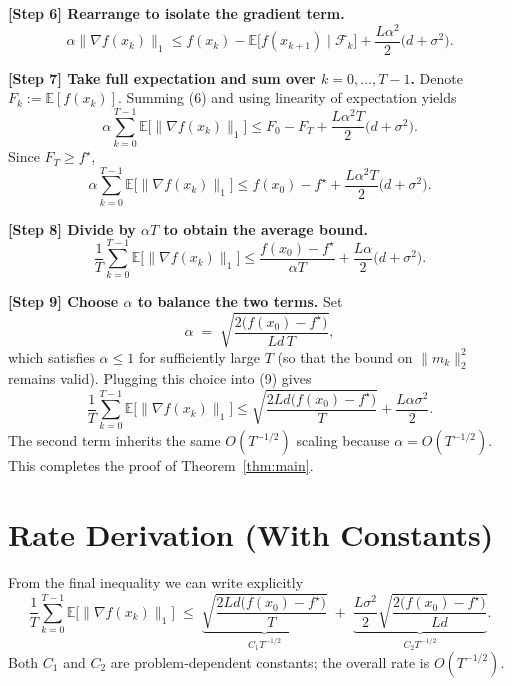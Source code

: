 \documentclass{article}
\newcommand{\E}{\mathbb{E}}
\begin{document}
\noindent\textbf{[Step 6] Rearrange to isolate the gradient term.}
\[
\alpha\|\nabla f(x_{k})\|_{1}
\le f(x_{k})-\E\!\bigl[f(x_{k+1})\mid\mathcal{F}_{k}\bigr]
+\frac{L\alpha^{2}}{2}\bigl(d+\sigma^{2}\bigr). \tag{6}
\]

\noindent\textbf{[Step 7] Take full expectation and sum over $k=0,\dots ,T-1$.}
Denote $F_{k}:=\E[f(x_{k})]$. Summing (6) and using linearity of expectation yields
\[
\alpha\sum_{k=0}^{T-1}\E\!\bigl[\|\nabla f(x_{k})\|_{1}\bigr]
\le F_{0}-F_{T}
+ \frac{L\alpha^{2}T}{2}\bigl(d+\sigma^{2}\bigr). \tag{7}
\]
Since $F_{T}\ge f^{\star}$,
\[
\alpha\sum_{k=0}^{T-1}\E\!\bigl[\|\nabla f(x_{k})\|_{1}\bigr]
\le f(x_{0})-f^{\star}
+ \frac{L\alpha^{2}T}{2}\bigl(d+\sigma^{2}\bigr). \tag{8}
\]

\noindent\textbf{[Step 8] Divide by $\alpha T$ to obtain the average bound.}
\[
\frac{1}{T}\sum_{k=0}^{T-1}\E\!\bigl[\|\nabla f(x_{k})\|_{1}\bigr]
\le \frac{f(x_{0})-f^{\star}}{\alpha T}
+ \frac{L\alpha}{2}\bigl(d+\sigma^{2}\bigr). \tag{9}
\]

\noindent\textbf{[Step 9] Choose $\alpha$ to balance the two terms.}
Set
\[
\alpha \;=\; \sqrt{\frac{2\bigl(f(x_{0})-f^{\star}\bigr)}{L d\,T}},
\]
which satisfies $\alpha\le 1$ for sufficiently large $T$ (so that the bound on $\|m_{k}\|_{2}^{2}$ remains valid).  
Plugging this choice into (9) gives
\[
\frac{1}{T}\sum_{k=0}^{T-1}\E\!\bigl[\|\nabla f(x_{k})\|_{1}\bigr]
\le \sqrt{\frac{2L d\bigl(f(x_{0})-f^{\star}\bigr)}{T}}
   +\frac{L\alpha\sigma^{2}}{2}.
\]
The second term inherits the same $O(T^{-1/2})$ scaling because $\alpha=O(T^{-1/2})$.
This completes the proof of Theorem~\ref{thm:main}. \qedhere

\section*{Rate Derivation (With Constants)}
From the final inequality we can write explicitly
\[
\boxed{
\frac{1}{T}\sum_{k=0}^{T-1}\E\!\bigl[\|\nabla f(x_{k})\|_{1}\bigr]
\;\le\;
\underbrace{\sqrt{\frac{2L d\bigl(f(x_{0})-f^{\star}\bigr)}{T}}}_{\displaystyle C_{1}T^{-1/2}}
\;+\;
\underbrace{\frac{L\sigma^{2}}{2}\sqrt{\frac{2\bigl(f(x_{0})-f^{\star}\bigr)}{L d}}}_{\displaystyle C_{2}T^{-1/2}} }.
\]
Both $C_{1}$ and $C_{2}$ are problem‑dependent constants; the overall rate is $O(T^{-1/2})$.
\end{document}
